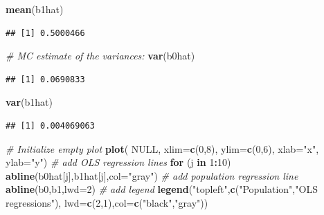 \documentclass[]{book}
\newenvironment{Shaded}{\begin{snugshade}}{\end{snugshade}}
\newcommand{\CommentTok}[1]{\textcolor[rgb]{0.56,0.35,0.01}{\textit{#1}}}
\newcommand{\ControlFlowTok}[1]{\textcolor[rgb]{0.13,0.29,0.53}{\textbf{#1}}}
\newcommand{\DataTypeTok}[1]{\textcolor[rgb]{0.13,0.29,0.53}{#1}}
\newcommand{\DecValTok}[1]{\textcolor[rgb]{0.00,0.00,0.81}{#1}}
\newcommand{\KeywordTok}[1]{\textcolor[rgb]{0.13,0.29,0.53}{\textbf{#1}}}
\newcommand{\NormalTok}[1]{#1}
\newcommand{\OperatorTok}[1]{\textcolor[rgb]{0.81,0.36,0.00}{\textbf{#1}}}
\newcommand{\OtherTok}[1]{\textcolor[rgb]{0.56,0.35,0.01}{#1}}
\newcommand{\StringTok}[1]{\textcolor[rgb]{0.31,0.60,0.02}{#1}}
\begin{document}
\begin{Shaded}
\begin{Highlighting}[]
\KeywordTok{mean}\NormalTok{(b1hat)}
\end{Highlighting}
\end{Shaded}

\begin{verbatim}
## [1] 0.5000466
\end{verbatim}

\begin{Shaded}
\begin{Highlighting}[]
\CommentTok{# MC estimate of the variances:}
\KeywordTok{var}\NormalTok{(b0hat)}
\end{Highlighting}
\end{Shaded}

\begin{verbatim}
## [1] 0.0690833
\end{verbatim}

\begin{Shaded}
\begin{Highlighting}[]
\KeywordTok{var}\NormalTok{(b1hat)}
\end{Highlighting}
\end{Shaded}

\begin{verbatim}
## [1] 0.004069063
\end{verbatim}

\begin{Shaded}
\begin{Highlighting}[]
\CommentTok{# Initialize empty plot}
\KeywordTok{plot}\NormalTok{( }\OtherTok{NULL}\NormalTok{, }\DataTypeTok{xlim=}\KeywordTok{c}\NormalTok{(}\DecValTok{0}\NormalTok{,}\DecValTok{8}\NormalTok{), }\DataTypeTok{ylim=}\KeywordTok{c}\NormalTok{(}\DecValTok{0}\NormalTok{,}\DecValTok{6}\NormalTok{), }\DataTypeTok{xlab=}\StringTok{"x"}\NormalTok{, }\DataTypeTok{ylab=}\StringTok{"y"}\NormalTok{)}
\CommentTok{# add OLS regression lines}
\ControlFlowTok{for}\NormalTok{ (j }\ControlFlowTok{in} \DecValTok{1}\OperatorTok{:}\DecValTok{10}\NormalTok{) }\KeywordTok{abline}\NormalTok{(b0hat[j],b1hat[j],}\DataTypeTok{col=}\StringTok{"gray"}\NormalTok{)}
\CommentTok{# add population regression line}
\KeywordTok{abline}\NormalTok{(b0,b1,}\DataTypeTok{lwd=}\DecValTok{2}\NormalTok{)}
\CommentTok{# add legend}
\KeywordTok{legend}\NormalTok{(}\StringTok{"topleft"}\NormalTok{,}\KeywordTok{c}\NormalTok{(}\StringTok{"Population"}\NormalTok{,}\StringTok{"OLS regressions"}\NormalTok{),}
       \DataTypeTok{lwd=}\KeywordTok{c}\NormalTok{(}\DecValTok{2}\NormalTok{,}\DecValTok{1}\NormalTok{),}\DataTypeTok{col=}\KeywordTok{c}\NormalTok{(}\StringTok{"black"}\NormalTok{,}\StringTok{"gray"}\NormalTok{))}
\end{Highlighting}
\end{Shaded}
\end{document}
